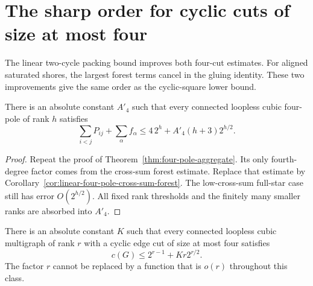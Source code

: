 \section{The sharp order for cyclic cuts of size at most four}
\label{sec:four-cut-sharp-order}

The linear two-cycle packing bound improves both four-cut estimates.
For aligned saturated shores, the largest forest terms cancel in the gluing identity.
These two improvements give the same order as the cyclic-square lower bound.

\begin{corollary}
\label{cor:linear-four-pole-aggregate}
There is an absolute constant $A'_4$ such that every connected loopless cubic four-pole of rank $h$ satisfies
\[
 \sum_{i<j}P_{ij}+\sum_\alpha f_\alpha
 \le4\,2^h+A'_4(h+3)2^{h/2}.
\]
\end{corollary}

\begin{proof}
Repeat the proof of Theorem~\ref{thm:four-pole-aggregate}.
Its only fourth-degree factor comes from the cross-sum forest estimate.
Replace that estimate by Corollary~\ref{cor:linear-four-pole-cross-sum-forest}.
The low-cross-sum full-star case still has error $O(2^{h/2})$.
All fixed rank thresholds and the finitely many smaller ranks are absorbed into $A'_4$.
\end{proof}

\begin{theorem}
\label{thm:sharp-order-four-cut-error}
There is an absolute constant $K$ such that every connected loopless cubic multigraph of rank $r$ with a cyclic edge cut of size at most four satisfies
\[
 c(G)\le2^{r-1}+Kr2^{r/2}.
\]
The factor $r$ cannot be replaced by a function that is $o(r)$ throughout this class.
\end{theorem}


